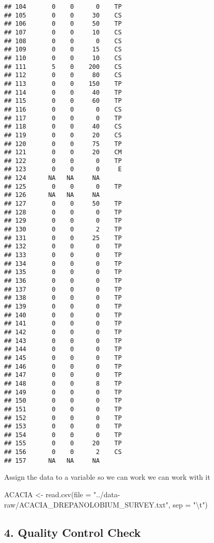 \documentclass[
]{article}
\newenvironment{Shaded}{\begin{snugshade}}{\end{snugshade}}
\newcommand{\AttributeTok}[1]{\textcolor[rgb]{0.77,0.63,0.00}{#1}}
\newcommand{\FunctionTok}[1]{\textcolor[rgb]{0.00,0.00,0.00}{#1}}
\newcommand{\NormalTok}[1]{#1}
\newcommand{\OtherTok}[1]{\textcolor[rgb]{0.56,0.35,0.01}{#1}}
\newcommand{\SpecialCharTok}[1]{\textcolor[rgb]{0.00,0.00,0.00}{#1}}
\newcommand{\StringTok}[1]{\textcolor[rgb]{0.31,0.60,0.02}{#1}}
\begin{document}
\begin{verbatim}
## 104       0    0      0    TP
## 105       0    0     30    CS
## 106       0    0     50    TP
## 107       0    0     10    CS
## 108       0    0      0    CS
## 109       0    0     15    CS
## 110       0    0     10    CS
## 111       5    0    200    CS
## 112       0    0     80    CS
## 113       0    0    150    TP
## 114       0    0     40    TP
## 115       0    0     60    TP
## 116       0    0      0    CS
## 117       0    0      0    TP
## 118       0    0     40    CS
## 119       0    0     20    CS
## 120       0    0     75    TP
## 121       0    0     20    CM
## 122       0    0      0    TP
## 123       0    0      0     E
## 124      NA   NA     NA      
## 125       0    0      0    TP
## 126      NA   NA     NA      
## 127       0    0     50    TP
## 128       0    0      0    TP
## 129       0    0      0    TP
## 130       0    0      2    TP
## 131       0    0     25    TP
## 132       0    0      0    TP
## 133       0    0      0    TP
## 134       0    0      0    TP
## 135       0    0      0    TP
## 136       0    0      0    TP
## 137       0    0      0    TP
## 138       0    0      0    TP
## 139       0    0      0    TP
## 140       0    0      0    TP
## 141       0    0      0    TP
## 142       0    0      0    TP
## 143       0    0      0    TP
## 144       0    0      0    TP
## 145       0    0      0    TP
## 146       0    0      0    TP
## 147       0    0      0    TP
## 148       0    0      8    TP
## 149       0    0      0    TP
## 150       0    0      0    TP
## 151       0    0      0    TP
## 152       0    0      0    TP
## 153       0    0      0    TP
## 154       0    0      0    TP
## 155       0    0     20    TP
## 156       0    0      2    CS
## 157      NA   NA     NA
\end{verbatim}

Assign the data to a variable so we can work we can work with it

\begin{Shaded}
\begin{Highlighting}[]
\NormalTok{ACACIA }\OtherTok{\textless{}{-}} \FunctionTok{read.csv}\NormalTok{(}\AttributeTok{file =} \StringTok{"../data{-}raw/ACACIA\_DREPANOLOBIUM\_SURVEY.txt"}\NormalTok{, }\AttributeTok{sep =} \StringTok{"}\SpecialCharTok{\textbackslash{}t}\StringTok{"}\NormalTok{)}
\end{Highlighting}
\end{Shaded}

\hypertarget{quality-control-check}{%
\subsection{4. Quality Control Check}\label{quality-control-check}}
\end{document}
